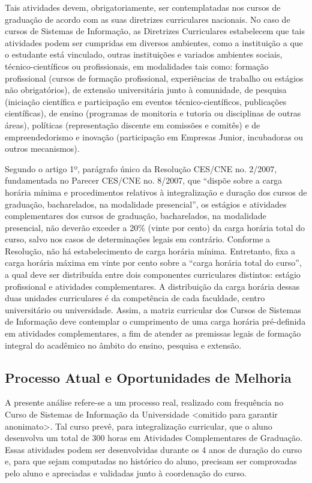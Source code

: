 \documentclass[12pt]{article}
\begin{document}
Tais atividades devem, obrigatoriamente, ser contemplatadas nos cursos de graduação de acordo com as suas diretrizes curriculares nacionais. No caso de cursos de Sistemas de Informação, as Diretrizes Curriculares estabelecem que tais atividades podem ser cumpridas em diversos ambientes, como a instituição a que o estudante está vinculado, outras instituições e variados ambientes sociais, técnico-científicos ou profissionais, em modalidades tais como: formação profissional (cursos de formação profissional, experiências de trabalho ou estágios não obrigatórios), de extensão universitária junto à comunidade, de pesquisa (iniciação científica e participação em eventos técnico-científicos, publicações científicas), de ensino (programas de monitoria e tutoria ou disciplinas de outras áreas), políticas (representação discente em comissões e comitês) e de empreendedorismo e inovação (participação em Empresas Junior, incubadoras ou outros mecanismos).

Segundo o artigo 1º, parágrafo único da Resolução CES/CNE no. 2/2007, fundamentada no Parecer CES/CNE no. 8/2007, que “dispõe sobre a carga horária mínima e procedimentos relativos à integralização e duração dos cursos de graduação, bacharelados, na modalidade presencial”, os estágios e atividades complementares dos cursos de graduação, bacharelados, na modalidade presencial, não deverão exceder a 20\% (vinte por cento) da carga horária total do curso, salvo nos casos de determinações legais em contrário. Conforme a Resolução, não há estabelecimento de carga horária mínima. Entretanto, fixa a carga horária máxima em vinte por cento sobre a “carga horária total do curso”, a qual deve ser distribuída entre dois componentes curriculares distintos: estágio profissional e atividades complementares. A distribuição da carga horária dessas duas unidades curriculares é da competência de cada faculdade, centro universitário ou universidade. Assim, a matriz curricular dos Cursos de Sistemas de Informação deve contemplar o cumprimento de uma carga horária pré-definida em atividades complementares,  a fim de atender  as premissas legais de formação integral do acadêmico no âmbito do ensino, pesquisa e extensão.

\subsection{Processo Atual e Oportunidades de Melhoria}

A presente análise refere-se a um processo real, realizado com frequência no Curso de Sistemas de Informação da Universidade <omitido para garantir anonimato>. Tal curso prevê, para integralização curricular, que o aluno desenvolva um total de 300 horas em Atividades Complementares de Graduação. Essas atividades podem ser desenvolvidas durante os 4 anos de duração do curso e, para que sejam computadas no histórico do aluno, precisam ser comprovadas pelo aluno e apreciadas e validadas junto à coordenação do curso.
\end{document}
